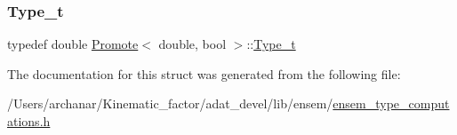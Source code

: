 \subsubsection{\texorpdfstring{Type\_t}{Type\_t}\hspace{0.1cm}{\footnotesize\ttfamily [2/2]}}
{\footnotesize\ttfamily typedef double \mbox{\hyperlink{structPromote}{Promote}}$<$ double, bool $>$\+::\mbox{\hyperlink{structPromote_3_01double_00_01bool_01_4_a0daa22cf2a9d3b7070f5d6945d770c68}{Type\+\_\+t}}}



The documentation for this struct was generated from the following file\+:\begin{DoxyCompactItemize}
\item 
/\+Users/archanar/\+Kinematic\+\_\+factor/adat\+\_\+devel/lib/ensem/\mbox{\hyperlink{lib_2ensem_2ensem__type__computations_8h}{ensem\+\_\+type\+\_\+computations.\+h}}\end{DoxyCompactItemize}
